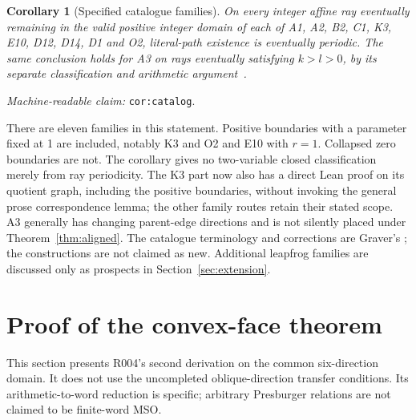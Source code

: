 \documentclass[11pt]{amsart}
\newcommand{\record}[1]{\nolinkurl{#1}}
\newcommand{\claimid}[1]{\par\nopagebreak\noindent\textit{Machine-readable claim:} \record{#1}.\par}
\newtheorem{catalogcor}{Corollary}
\theoremstyle{definition}\newtheorem{definition}{Definition}
\begin{document}
\begin{catalogcor}[Specified catalogue families]\label{cor:catalog}
On every integer affine ray eventually remaining in the valid positive
integer domain of each of A1, A2, B2, C1, K3, E10, D12, D14, D1 and O2,
literal-path existence is eventually periodic. The same conclusion
holds for A3 on rays eventually satisfying $k>l>0$, by its separate
classification and arithmetic argument~\cite{A3}.
\end{catalogcor}
\claimid{cor:catalog}
There are eleven families in this statement. Positive boundaries with
a parameter fixed at 1 are included, notably K3 and O2 and E10 with
$r=1$. Collapsed zero boundaries are not. The corollary gives no
two-variable closed classification merely from ray periodicity.
The K3 part now also has a direct Lean proof on its quotient graph,
including the positive boundaries, without invoking the general prose
correspondence lemma; the other family routes retain their stated scope.
A3 generally has changing parent-edge directions and is not silently
placed under Theorem~\ref{thm:aligned}. The catalogue terminology and
corrections are Graver's \cite{Graver}; the constructions are not claimed
as new. Additional leapfrog families are discussed only as prospects
in Section~\ref{sec:extension}.

\section{Proof of the convex-face theorem}\label{sec:proof}
This section presents R004's second derivation on the common
six-direction domain. It does not use the uncompleted oblique-direction
transfer conditions. Its arithmetic-to-word reduction is specific;
arbitrary Presburger relations are not claimed to be finite-word MSO.
\end{document}
